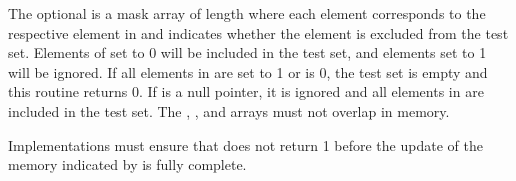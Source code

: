 \begin{apidefinition}
{    The optional  is a mask array of length  where each element
    corresponds to the respective element in  and indicates whether
    the element is excluded from the test set.  Elements of  set to
    0 will be included in the test set, and elements set to 1 will be ignored.  If all elements
    in  are set to 1 or  is 0, the test set is empty
    and this routine returns 0.  If  is a null pointer, it is
    ignored and all elements in  are included in the test set.  The
    , , and  arrays must not overlap in
    memory.

    Implementations must ensure that  does not
    return 1 before the update of the memory indicated by  is fully
    complete.
}


\end{apidefinition}
